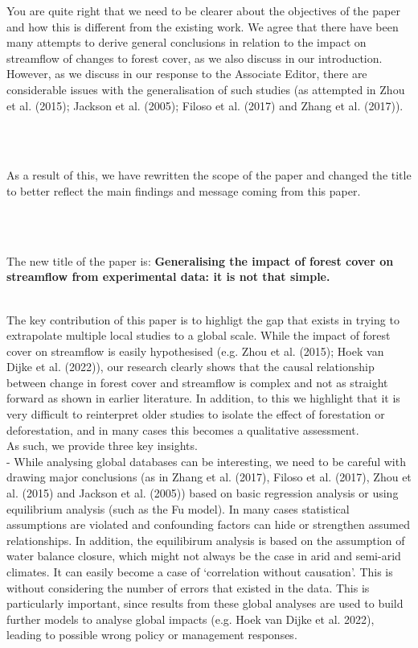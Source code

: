 \documentclass[]{elsarticle} %
\begin{document}
You are quite right that we need to be clearer about the objectives of the paper and how this is different from the existing work. We agree that there have been many attempts to derive general conclusions in relation to the impact on streamflow of changes to forest cover, as we also discuss in our introduction. However, as we discuss in our response to the Associate Editor, there are considerable issues with the generalisation of such studies (as attempted in Zhou et al. (2015); Jackson et al. (2005); Filoso et al. (2017) and Zhang et al. (2017)).\\
\strut \\
\strut \\
As a result of this, we have rewritten the scope of the paper and changed the title to better reflect the main findings and message coming from this paper.\\
\strut \\
\strut \\
The new title of the paper is:
\textbf{Generalising the impact of forest cover on streamflow from experimental data: it is not that simple.}\\
\strut \\
The key contribution of this paper is to highligt the gap that exists in trying to extrapolate multiple local studies to a global scale. While the impact of forest cover on streamflow is easily hypothesised (e.g. Zhou et al. (2015); Hoek van Dijke et al. (2022)), our research clearly shows that the causal relationship between change in forest cover and streamflow is complex and not as straight forward as shown in earlier literature. In addition, to this we highlight that it is very difficult to reinterpret older studies to isolate the effect of forestation or deforestation, and in many cases this becomes a qualitative assessment.\\
As such, we provide three key insights.\\
- While analysing global databases can be interesting, we need to be careful with drawing major conclusions (as in Zhang et al. (2017), Filoso et al. (2017), Zhou et al. (2015) and Jackson et al. (2005)) based on basic regression analysis or using equilibrium analysis (such as the Fu model). In many cases statistical assumptions are violated and confounding factors can hide or strengthen assumed relationships. In addition, the equilibirum analysis is based on the assumption of water balance closure, which might not always be the case in arid and semi-arid climates. It can easily become a case of `correlation without causation'. This is without considering the number of errors that existed in the data. This is particularly important, since results from these global analyses are used to build further models to analyse global impacts (e.g. Hoek van Dijke et al. 2022), leading to possible wrong policy or management responses.\\
\end{document}
